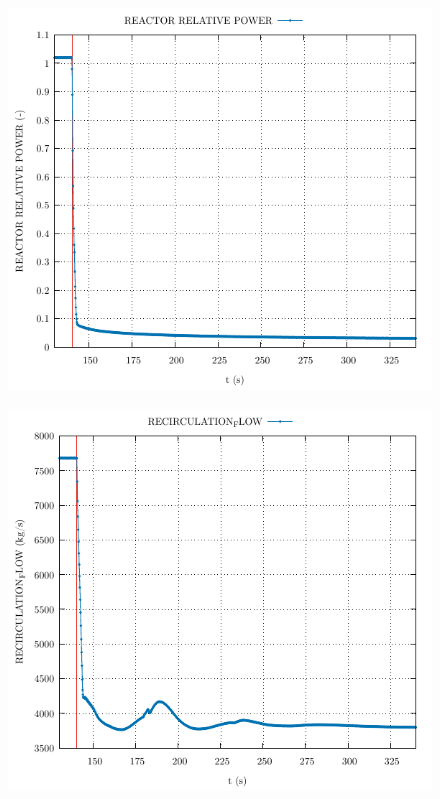 \documentclass{article}
\begin{document}
\begin{multicols}{2}
\begin{figure}[H]
\end{figure}
\begin{figure}[H]
\centering
\includegraphics[width=\linewidth]{./graphs/REACTOR RELATIVE POWER_comp.pdf}
\end{figure}
\begin{figure}[H]
\centering
\includegraphics[width=\linewidth]{./graphs/RECIRCULATION_FLOW_comp.pdf}

\end{figure}
\end{multicols}
\end{document}
